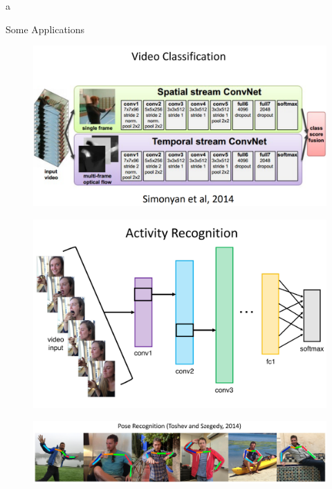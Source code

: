 a\documentclass[10pt]{beamer}
\theoremstyle{remark}
\theoremstyle{definition}
\begin{document}
\begin{frame}[allowframebreaks]{Some Applications}
\framebreak

\begin{figure}
\centering
\includegraphics[width=1.0\textwidth,height=0.9\textheight,keepaspectratio]{./images/cv_6.png}
\end{figure}


\framebreak

\begin{figure}
\centering
\includegraphics[width=1.0\textwidth,height=0.9\textheight,keepaspectratio]{./images/cv_7.png}
\end{figure}

\framebreak

\begin{figure}
\centering
\includegraphics[width=1.0\textwidth,height=0.9\textheight,keepaspectratio]{./images/cv_8.png}
\end{figure}


\end{frame}
\end{document}
